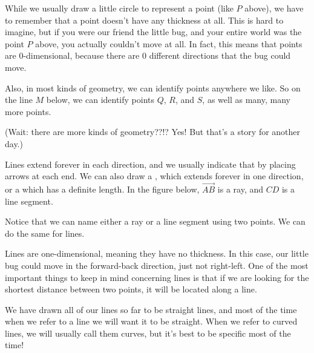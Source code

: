 \documentclass{ximera}
\begin{document}
While we usually draw a little circle to represent a point (like $P$ above), we have to remember that a point doesn't have any thickness at all. This is hard to imagine, but if you were our friend the little bug, and your entire world was the point $P$ above, you actually couldn't move at all. In fact, this means that points are $0$-dimensional, because there are $0$ different directions that the bug could move.

Also, in most kinds of geometry, we can identify points anywhere we like. So on the line $M$ below, we can identify points $Q$, $R$, and $S$, as well as many, many more points. 
\begin{image}
\end{image}
(Wait: there are more kinds of geometry??!? Yes! But that's a story for another day.)

Lines extend forever in each direction, and we usually indicate that by placing arrows at each end. We can also draw a , which extends forever in one direction, or a  which has a definite length. In the figure below, $\overrightarrow{AB}$ is a ray, and $CD$ is a line segment.
\begin{image}
\end{image}
Notice that we can name either a ray or a line segment using two points. We can do the same for lines.

Lines are one-dimensional, meaning they have no thickness. In this case, our little bug could move in the forward-back direction, just not right-left. One of the most important things to keep in mind concerning lines is that if we are looking for the shortest distance between two points, it will be located along a line.

We have drawn all of our lines so far to be straight lines, and most of the time when we refer to a line we will want it to be straight. When we refer to curved lines, we will usually call them curves, but it's best to be specific most of the time!
\end{document}
